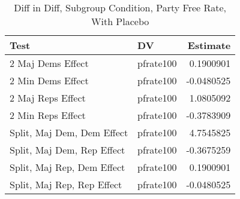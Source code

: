 \documentclass[12pt]{article}
\begin{document}
\begin{table}[H]
	\centering
	\caption{Diff in Diff, Subgroup Condition, Party Free Rate, With Placebo}
	\begin{tabular}{llr}
		\hline
		Test & DV & Estimate \\ 
		\hline
		2 Maj Dems Effect & pfrate100 & 0.1900901 \\ 
		2 Min Dems Effect & pfrate100 & -0.0480525 \\ 
		\hline
		2 Maj Reps Effect & pfrate100 & 1.0805092 \\ 
		2 Min Reps Effect & pfrate100 & -0.3783909 \\ 
		\hline
		Split, Maj Dem, Dem Effect & pfrate100 & 4.7545825 \\ 
		Split, Maj Dem, Rep Effect & pfrate100 & -0.3675259 \\ 
		\hline
		Split, Maj Rep, Dem Effect & pfrate100 & 0.1900901 \\ 
		Split, Maj Rep, Rep Effect & pfrate100 & -0.0480525 \\ 
		\hline
	\end{tabular}
\end{table}
\end{document}
